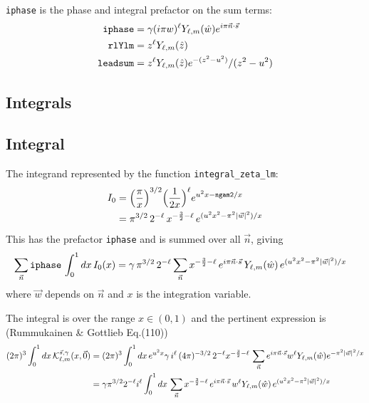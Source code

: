 \documentclass[a4paper]{article}
\begin{document}
{\tt iphase} is the phase and integral prefactor on the sum terms:
\begin{align}
 {\tt iphase} &= \gamma (i \pi w)^{\ell} Y_{\ell,m}(\hat{w}) e^{i\pi \vec{n}\cdot\vec{s}} \\
 {\tt rlYlm} &= z^{\ell} Y_{\ell,m}(\hat{z}) \\
 {\tt leadsum} &= z^{\ell} Y_{\ell,m}(\hat{z}) e^{-(z^{2}-u^{2})} / (z^2 -u^2)
\end{align}

\subsection{Integrals}

\subsection{Integral}

The integrand represented by the function {\tt integral\_zeta\_lm}:
\begin{align}
 I_0
 &= \Big( \frac{\pi}{x} \Big)^{3/2}
 \Big( \frac{1}{2x} \Big)^{\ell}
 e^{ u^{2}x - {\tt ngam2}/x } \nonumber\\
 &= \pi^{3/2} \, 2^{-\ell} \, x^{- \frac{3}{2} - \ell} \,
 e^{ (u^{2} x^{2} - \pi^{2} |\vec{w}|^{2})/x }
\end{align}
This has the prefactor {\tt iphase} and is summed over all $\vec{n}$,
 giving
\begin{align}
 \sum_{\vec{n}} {\tt iphase} \, \int_{0}^{1} dx \, I_0(x)
 &= \gamma \, \pi^{3/2} \, 2^{-\ell} \sum_{\vec{n}}
 x^{- \frac{3}{2} - \ell} \,
 e^{i\pi \vec{n}\cdot\vec{s}} \,
 Y_{\ell,m}(\hat{w}) \,
 e^{ (u^{2} x^{2} - \pi^{2} |\vec{w}|^{2})/x }
\end{align}
 where $\vec{w}$ depends on $\vec{n}$ and $x$ is the integration variable.

The integral is over the range $x \in (0,1)$ and the pertinent expression is
 (Rummukainen \& Gottlieb Eq.(110))
\begin{align}
 (2\pi)^{3} \int_{0}^{1} dx \, {\cal K}_{\ell,m}^{\vec{s},\gamma}(x,\vec{0})
 &= (2\pi)^{3} \int_{0}^{1} dx \, e^{ u^{2} x }
 \gamma \, i^{\ell} \, (4\pi)^{-3/2} \, 2^{-\ell} x^{- \frac{3}{2} - \ell} \,
 \sum_{\vec{n}} e^{i\pi \vec{n}\cdot\vec{s}} w^{\ell} Y_{\ell,m}(\hat{w})
 e^{ - \pi^{2} |\vec{w}|^{2} /x } \\
 &= \gamma \pi^{3/2} 2^{-\ell} i^{\ell}
 \int_{0}^{1} dx \,
 \sum_{\vec{n}}
 x^{- \frac{3}{2} - \ell} \,
 e^{i\pi \vec{n}\cdot\vec{s}} \,
 w^{\ell} Y_{\ell,m}(\hat{w}) \,
 e^{ ( u^{2} x^{2} - \pi^{2} |\vec{w}|^{2} ) /x }
\end{align}
\end{document}
